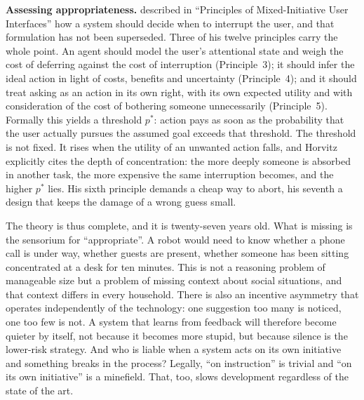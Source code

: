 \documentclass[acmlarge, nonacm]{acmart}
\begin{document}
\textbf{Assessing appropriateness.} \citet{horvitz1999} described in ``Principles of Mixed-Initiative User Interfaces'' how a system should decide when to interrupt the user, and that formulation has not been superseded. Three of his twelve principles carry the whole point. An agent should model the user's attentional state and weigh the cost of deferring against the cost of interruption (Principle~3); it should infer the ideal action in light of costs, benefits and uncertainty (Principle~4); and it should treat asking as an action in its own right, with its own expected utility and with consideration of the cost of bothering someone unnecessarily (Principle~5). Formally this yields a threshold $p^*$: action pays as soon as the probability that the user actually pursues the assumed goal exceeds that threshold. The threshold is not fixed. It rises when the utility of an unwanted action falls, and Horvitz explicitly cites the depth of concentration: the more deeply someone is absorbed in another task, the more expensive the same interruption becomes, and the higher $p^*$ lies. His sixth principle demands a cheap way to abort, his seventh a design that keeps the damage of a wrong guess small.

The theory is thus complete, and it is twenty-seven years old. What is missing is the sensorium for ``appropriate''. A robot would need to know whether a phone call is under way, whether guests are present, whether someone has been sitting concentrated at a desk for ten minutes. This is not a reasoning problem of manageable size but a problem of missing context about social situations, and that context differs in every household. There is also an incentive asymmetry that operates independently of the technology: one suggestion too many is noticed, one too few is not. A system that learns from feedback will therefore become quieter by itself, not because it becomes more stupid, but because silence is the lower-risk strategy. And who is liable when a system acts on its own initiative and something breaks in the process? Legally, ``on instruction'' is trivial and ``on its own initiative'' is a minefield. That, too, slows development regardless of the state of the art.
\end{document}
